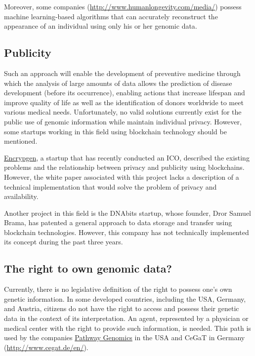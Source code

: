 Moreover, some companies (\url{http://www.humanlongevity.com/media/}) possess machine learning-based algorithms that can accurately reconstruct the appearance of an individual using only his or her genomic data\cite{TED:FaceFromDNA}.

\subsection{Publicity}
Such an approach will enable the development of preventive medicine through which the analysis of large amounts of data allows the prediction of disease development (before its occurrence), enabling actions that increase lifespan and improve quality of life\cite{jpm2030093} as well as the identification of donors worldwide to meet various medical needs. Unfortunately, no valid solutions currently exist for the public use of genomic information while maintain individual privacy. However, some startups working in this field using blockchain technology should be mentioned.

\href{https://www.encrypgen.com/}{Encrypgen}, a startup that has recently conducted an ICO, described the existing problems and the relationship between privacy and publicity using blockchains\cite{forbes:missinglink}. However, the white paper associated with this project lacks a description of a technical implementation that would solve the problem of privacy and availability.

Another project in this field is the DNAbits startup\cite{coindesk.com:DNAbits}, whose founder, Dror Samuel Brama, has patented a general approach to data storage and transfer using blockchain technologies\cite{brama2015method}. However, this company has not technically implemented its concept during the past three years.

\subsection{The right to own genomic data?}
Currently, there is no legislative definition of the right to possess one’s own genetic information. In some developed countries, including the USA, Germany, and Austria, citizens do not have the right to access and possess their genetic data in the context of its interpretation\cite{goodreads.com:24714901}.  An agent, represented by a physician or medical center with the right to provide such information, is needed. This path is used by the companies \href{https://www.pathway.com/}{Pathway Genomics} in the USA and CeGaT in Germany (\url{http://www.cegat.de/en/}).

